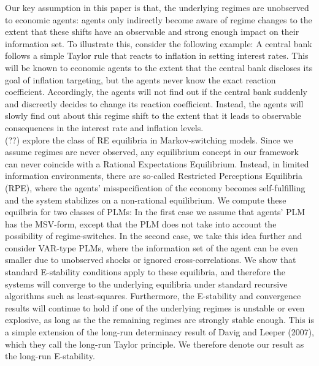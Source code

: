 \documentclass[12pt,reqno]{article}
\numberwithin{equation}{section}
\begin{document}
Our key assumption in this paper is that, the underlying regimes are unobserved to economic agents: agents only indirectly become aware of regime changes to the extent that these shifts have an observable and strong enough impact on their information set. To illustrate this, consider the following example: A central bank follows a simple Taylor rule that reacts to inflation in setting interest rates. This will be known to economic agents to the extent that the central bank discloses its goal of inflation targeting, but the agents never know the exact reaction coefficient. Accordingly, the agents will not find out if the central bank suddenly and discreetly decides to change its reaction coefficient. Instead, the agents will slowly find out about this regime shift to the extent that it leads to observable consequences in the interest rate and inflation levels. \\

(??) explore the class of RE equilibria in Markov-switching models. Since we assume regimes are never observed, any equilibrium concept in our framework can never coincide with a Rational Expectations Equilibrium. Instead, in limited information environments, there are so-called Restricted Perceptions Equilibria (RPE), where the agents' misspecification of the economy becomes self-fulfilling and the system stabilizes on a non-rational equilibrium. We compute these equilbria for two classes of PLMs: In the first case we assume that agents' PLM has the MSV-form, except that the PLM does not take into account the possibility of regime-switches. In the second case, we take this idea further and consider VAR-type PLMs, where the information set of the agent can be even smaller due to unobserved shocks or ignored cross-correlations. We show that standard E-stability conditions apply to these equilibria, and therefore the systems will converge to the underlying equilibria under standard recursive algorithms such as least-squares. Furthermore, the E-stability and convergence results will continue to hold if one of the underlying regimes is unstable or even explosive, as long as the the remaining regimes are strongly stable enough. This is a simple extension of the long-run determinacy result of Davig and Leeper (2007), which they call the long-run Taylor principle. We therefore denote our result as the long-run E-stability.\\
\end{document}
